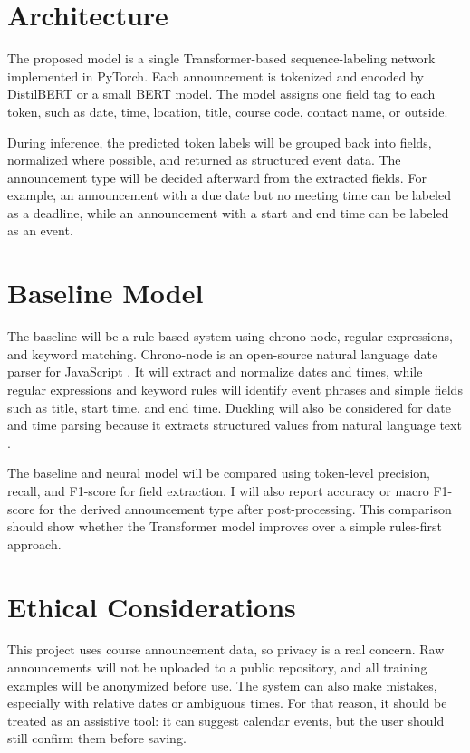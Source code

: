 \documentclass[final]{article}
\begin{document}
\section*{Architecture}
The proposed model is a single Transformer-based sequence-labeling network implemented in PyTorch. Each announcement is tokenized and encoded by DistilBERT or a small BERT model. The model assigns one field tag to each token, such as date, time, location, title, course code, contact name, or outside.

During inference, the predicted token labels will be grouped back into fields, normalized where possible, and returned as structured event data. The announcement type will be decided afterward from the extracted fields. For example, an announcement with a due date but no meeting time can be labeled as a deadline, while an announcement with a start and end time can be labeled as an event.

\section*{Baseline Model}
The baseline will be a rule-based system using chrono-node, regular expressions, and keyword matching. Chrono-node is an open-source natural language date parser for JavaScript \citep{chrono}. It will extract and normalize dates and times, while regular expressions and keyword rules will identify event phrases and simple fields such as title, start time, and end time. Duckling will also be considered for date and time parsing because it extracts structured values from natural language text \citep{duckling}.

The baseline and neural model will be compared using token-level precision, recall, and F1-score for field extraction. I will also report accuracy or macro F1-score for the derived announcement type after post-processing. This comparison should show whether the Transformer model improves over a simple rules-first approach.

\section*{Ethical Considerations}
This project uses course announcement data, so privacy is a real concern. Raw announcements will not be uploaded to a public repository, and all training examples will be anonymized before use. The system can also make mistakes, especially with relative dates or ambiguous times. For that reason, it should be treated as an assistive tool: it can suggest calendar events, but the user should still confirm them before saving.
\end{document}
